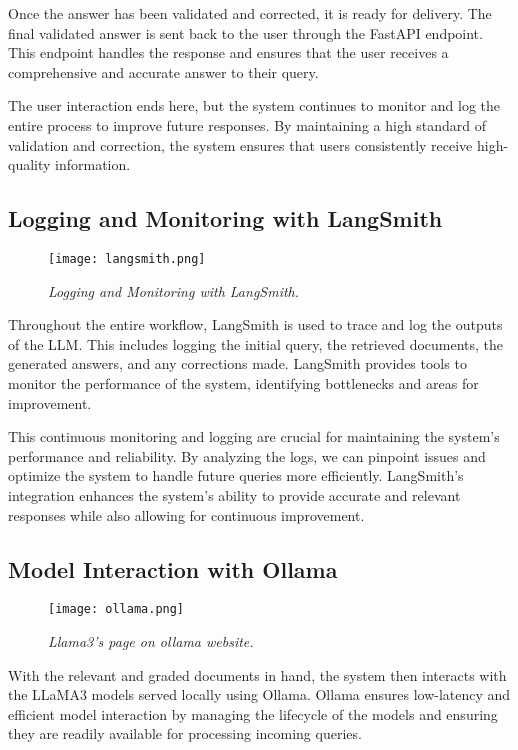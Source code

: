 Once the answer has been validated and corrected, it is ready for delivery. The final validated answer is sent back to the user through the FastAPI endpoint. This endpoint handles the response and ensures that the user receives a comprehensive and accurate answer to their query.

The user interaction ends here, but the system continues to monitor and log the entire process to improve future responses. By maintaining a high standard of validation and correction, the system ensures that users consistently receive high-quality information.

\subsection{Logging and Monitoring with LangSmith}

\begin{figure}[H]
    \centering
    \texttt{[image: langsmith.png]}
    \caption{
        \it{Logging and Monitoring with LangSmith.}
    }
\end{figure}

Throughout the entire workflow, LangSmith is used to trace and log the outputs of the LLM. This includes logging the initial query, the retrieved documents, the generated answers, and any corrections made. LangSmith provides tools to monitor the performance of the system, identifying bottlenecks and areas for improvement.

This continuous monitoring and logging are crucial for maintaining the system's performance and reliability. By analyzing the logs, we can pinpoint issues and optimize the system to handle future queries more efficiently. LangSmith's integration enhances the system's ability to provide accurate and relevant responses while also allowing for continuous improvement.

\subsection{Model Interaction with Ollama}

\begin{figure}[H]
    \centering
    \texttt{[image: ollama.png]}
    \caption{
        \it{Llama3's page on ollama website.}
    }
\end{figure}

With the relevant and graded documents in hand, the system then interacts with the LLaMA3 models served locally using Ollama. Ollama ensures low-latency and efficient model interaction by managing the lifecycle of the models and ensuring they are readily available for processing incoming queries.

